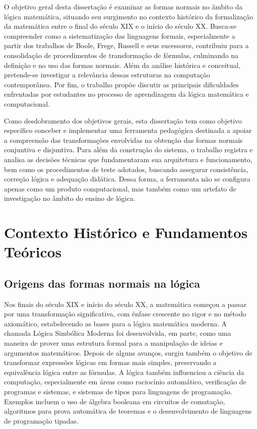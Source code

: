 \documentclass[12pt,a4paper,oneside]{report}
\theoremstyle{tituloplain}
\theoremstyle{titulodef}
\begin{document}
O objetivo geral desta dissertação é examinar as formas normais no âmbito da lógica matemática, situando seu surgimento no contexto histórico da formalização da matemática entre o final do século XIX e o início do século XX. Busca-se compreender como a sistematização das linguagens formais, especialmente a partir dos trabalhos de Boole, Frege, Russell e seus sucessores, contribuiu para a consolidação de procedimentos de transformação de fórmulas, culminando na definição e no uso das formas normais. Além da análise histórica e conceitual, pretende-se investigar a relevância dessas estruturas na computação contemporânea. Por fim, o trabalho propõe discutir as principais dificuldades enfrentadas por estudantes no processo de aprendizagem da lógica matemática e computacional.

Como desdobramento dos objetivos gerais, esta dissertação tem como objetivo específico conceber e implementar uma ferramenta pedagógica destinada a apoiar a compreensão das transformações envolvidas na obtenção das formas normais conjuntiva e disjuntiva. Para além da construção do sistema, o trabalho registra e analisa as decisões técnicas que fundamentaram sua arquitetura e funcionamento, bem como os procedimentos de teste adotados, buscando assegurar consistência, correção lógica e adequação didática. Dessa forma, a ferramenta não se configura apenas como um produto computacional, mas também como um artefato de investigação no âmbito do ensino de lógica.

\chapter{Contexto Histórico e Fundamentos Teóricos}\label{cap:fundamentos}
\section{Origens das formas normais na lógica}\label{sec:origens}

Nos finais do século XIX e início do século XX, a matemática começou a passar por uma transformação significativa, com ênfase crescente no rigor e no método axiomático, estabelecendo as bases para a lógica matemática moderna. A chamada Lógica Simbólica Moderna foi desenvolvida, em parte, como uma maneira de prover uma estrutura formal para a manipulação de ideias e argumentos matemáticos. Depois de alguns avanços, surgiu também o objetivo de transformar expressões lógicas em formas mais simples, preservando a equivalência lógica entre as fórmulas. A lógica também influenciou a ciência da computação, especialmente em áreas como raciocínio automático, verificação de programas e sistemas, e sistemas de tipos para linguagens de programação. Exemplos incluem o uso de álgebra booleana em circuitos de comutação, algoritmos para prova automática de teoremas e o desenvolvimento de linguagens de programação tipadas. \cite{Zach2024Logic}
\end{document}
